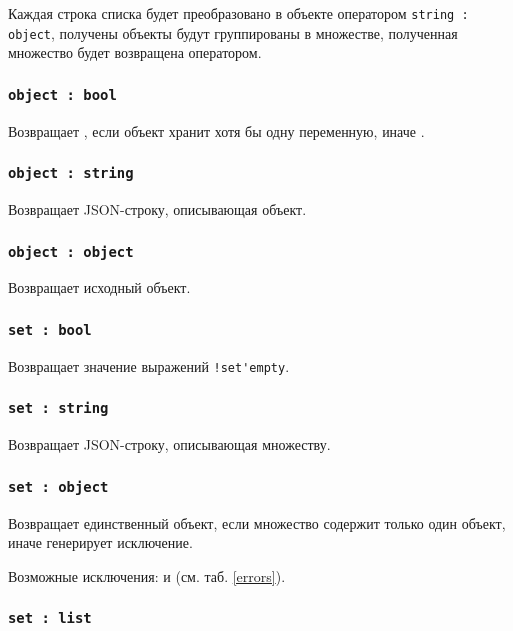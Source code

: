 Каждая строка списка будет преобразовано в объекте оператором \lstinline|string : object|, получены объекты будут группированы в множестве, полученная множество будет возвращена оператором.

\subsubsection{\lstinline|object : bool|}

Возвращает \true, если объект хранит хотя бы одну переменную, иначе \false.

\subsubsection{\lstinline|object : string|}

Возвращает JSON-строку, описывающая объект.

\subsubsection{\lstinline|object : object|}

Возвращает исходный объект.

\subsubsection{\lstinline|set : bool|}

Возвращает значение выражений \lstinline|!set'empty|.

\subsubsection{\lstinline|set : string|}

Возвращает JSON-строку, описывающая множеству.

\subsubsection{\lstinline|set : object|}

Возвращает единственный объект, если множество содержит только один объект, иначе генерирует исключение.

Возможные исключения:  и  (см. таб. \ref{errors}).

\subsubsection{\lstinline|set : list|}

